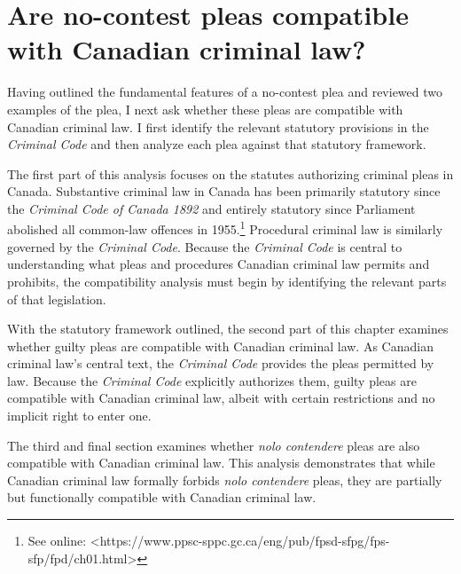 \chapter{ Are no-contest pleas compatible with Canadian criminal law?}
Having outlined the fundamental features of a no-contest plea and reviewed two examples of the plea, I next ask whether these pleas are compatible with Canadian criminal law. I first identify the relevant statutory provisions in the \textit{Criminal Code} and then analyze each plea against that statutory framework.

The first part of this analysis focuses on the statutes authorizing criminal pleas in Canada. Substantive criminal law in Canada has been primarily statutory since the \textit{Criminal Code of Canada 1892} and entirely statutory since Parliament abolished all common-law offences in 1955.\footnote{See online: \textless https://www.ppsc-sppc.gc.ca/eng/pub/fpsd-sfpg/fps-sfp/fpd/ch01.html\textgreater} Procedural criminal law is similarly governed by the \textit{Criminal Code}. Because the \textit{Criminal Code} is central to understanding what pleas and procedures Canadian criminal law permits and prohibits, the compatibility analysis must begin by identifying the relevant parts of that legislation.

With the statutory framework outlined, the second part of this chapter examines whether guilty pleas are compatible with Canadian criminal law. As Canadian criminal law's central text, the \textit{Criminal Code} provides the pleas permitted by law. Because the \textit{Criminal Code} explicitly authorizes them, guilty pleas are compatible with Canadian criminal law, albeit with certain restrictions and no implicit right to enter one. 

The third and final section examines whether \textit{nolo contendere} pleas are also compatible with Canadian criminal law. This analysis demonstrates that while Canadian criminal law formally forbids \textit{nolo contendere} pleas, they are partially but functionally compatible with Canadian criminal law.